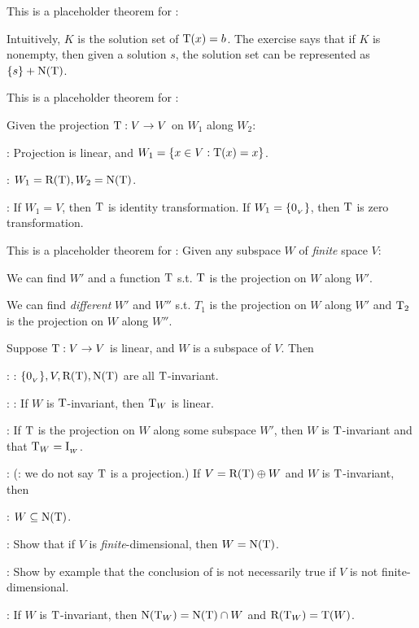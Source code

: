 \begin{additional theorem} \label{athm 2.6}
This is a placeholder theorem for :

Intuitively, \(K\) is the solution set of \(\mathrm{T}(x) = b\).
The exercise says that if \(K\) is nonempty, then given a solution \(s\), the solution set can be represented as \(\{ s \} + \mathrm{N(T)}\).
\end{additional theorem}

\begin{additional theorem} \label{athm 2.7}
This is a placeholder theorem for :

Given the projection \(\mathrm{T} : V \to V\) on \(W_1\) along \(W_2\):

: Projection is linear, and \(W_1 = \{ x \in V: \mathrm{T}(x) = x \}\).

: \(W_1 = \mathrm{R(T)}, W_2 = \mathrm{N(T)}\).

: If \(W_1 = V\), then \(\mathrm{T}\) is identity transformation.
If \(W_1 = \{ 0_{_V} \}\), then \(\mathrm{T}\) is zero transformation.
\end{additional theorem}

\begin{additional theorem} \label{athm 2.8}
This is a placeholder theorem for :
Given any subspace \(W\) of \emph{finite} space \(V\):

 We can find \(W'\) and a function \(\mathrm{T}\) s.t. \(\mathrm{T}\) is the projection on \(W\) along \(W'\).

 We can find \emph{different} \(W'\) and \(W''\) s.t. \(T_1\) is the projection on \(W\) along \(W'\) and \(\mathrm{T}_2\) is the projection on \(W\) along \(W''\).
\end{additional theorem}

\begin{additional theorem} \label{athm 2.9}
Suppose \(\mathrm{T} : V \to V\) is linear, and \(W\) is a subspace of \(V\).
Then

: : \(\{ 0_{_V} \}, V, \mathrm{R(T)}, \mathrm{N(T)}\) are all \(\mathrm{T}\)-invariant.

: : If \(W\) is \(\mathrm{T}\)-invariant, then \(\mathrm{T}_W\) is linear.

 : If \(\mathrm{T}\) is the projection on \(W\) along some subspace \(W'\), then \(W\) is \(\mathrm{T}\)-invariant and that \(\mathrm{T}_W = \mathrm{I}_{_W}\).

: (: we do not say \(\mathrm{T}\) is a projection.)
If \(V = \mathrm{R(T)} \oplus W\) and \(W\) is \(\mathrm{T}\)-invariant, then

: \(W \subseteq \mathrm{N(T)}\).

: Show that if \(V\) is \emph{finite}-dimensional, then \(W = \mathrm{N(T)}\).

: Show by example that the conclusion of  is not necessarily true if \(V\) is not finite-dimensional.


:
If \(W\) is \(\mathrm{T}\)-invariant, then \(\mathrm{N}(\mathrm{T}_W) = \mathrm{N(T)} \cap W\) and \(\mathrm{R}(\mathrm{T}_W) = \mathrm{T}(W)\).
\end{additional theorem}

